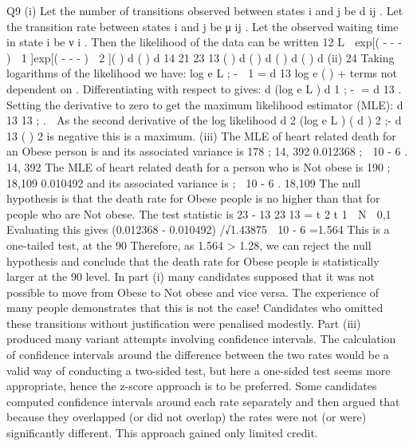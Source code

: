 Q9
(i)
Let the number of transitions observed between states i and j be d ij .
Let the transition rate between states i and j be μ ij .
Let the observed waiting time in state i be ν i .
Then the likelihood of the data can be written
12
L  exp[( - -  -  )  1 ]exp[( - -  -  )  2 ](  ) d (  ) d
14
21
23
13
(  ) d (  ) d (  ) d (  ) d
(ii)
24
Taking logarithms of the likelihood we have:
log e L ;\+\; -  1 \;=\; d 13 log e (  ) + terms not dependent on  .
Differentiating with respect to  gives:
d (log e L )
d 
1
;\+\; - \;=\;
d 13
.
Setting the derivative to zero to get the maximum likelihood estimator (MLE):
d 13
\hat{\mu} 13 ;\+ .

As the second derivative of the log likelihood
d 2 (log e L )
( d  ) 2
;\+\;-
d 13
(  ) 2
is negative this is a maximum.
(iii)
The MLE of heart related death for an Obese person is
and its associated variance is
178
;\+
14, 392
0.012368
;\+  10 - 6 .
14, 392
The MLE of heart related death for a person who is Not obese is
190
;\+
18,109
0.010492
and its associated variance is
;\+  10 - 6 .
18,109
The null hypothesis is that the death rate for Obese people is no higher than
that for people who are Not obese.
The test statistic is
\hat{\mu} 23 - \hat{\mu} 13
23
13
\hat{\mu}
\hat{\mu}
\;=\;
t 2
t 1
 N  0,1 
Evaluating this gives (0.012368 - 0.010492) /√1.43875  10 - 6 =1.564
This is a one-tailed test, at the 90%
Therefore, as 1.564 > 1.28, we can reject the null hypothesis and conclude that
the death rate for Obese people is statistically larger at the 90%
level.
In part (i) many candidates supposed that it was not possible to move from
Obese to Not obese and vice versa. The experience of many people
demonstrates that this is not the case! Candidates who omitted these
transitions without justification were penalised modestly. Part (iii) produced
many variant attempts involving confidence intervals. The calculation of
confidence intervals around the difference between the two rates would be a
valid way of conducting a two-sided test, but here a one-sided test seems
more appropriate, hence the z-score approach is to be preferred. Some
candidates computed confidence intervals around each rate separately and
then argued that because they overlapped (or did not overlap) the rates were
not (or were) significantly different. This approach gained only limited credit.

